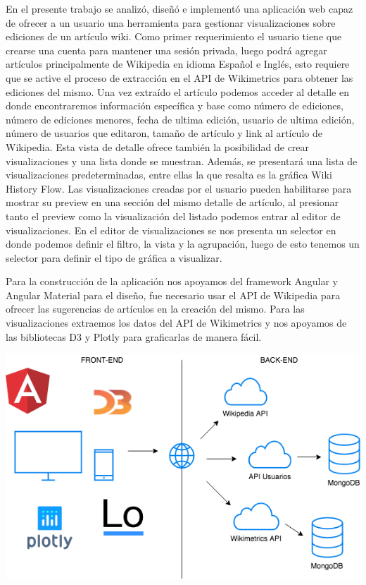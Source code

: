 En el presente trabajo se analizó, diseñó e implementó una aplicación web capaz de ofrecer a un usuario una herramienta para gestionar visualizaciones sobre ediciones de un artículo wiki. Como primer requerimiento el usuario tiene que crearse una cuenta para mantener una sesión privada, luego podrá agregar artículos principalmente de Wikipedia en idioma Español e Inglés, esto requiere que se active el proceso de extracción en el API de Wikimetrics para obtener las ediciones del mismo. Una vez extraído el artículo podemos acceder al detalle en donde encontraremos información específica y base como número de ediciones, número de ediciones menores, fecha de ultima edición, usuario de ultima edición, número de usuarios que editaron, tamaño de artículo y link al artículo de Wikipedia. Esta vista de detalle ofrece también la posibilidad de crear visualizaciones y una lista donde se muestran. Además, se presentará una lista de visualizaciones predeterminadas, entre ellas la que resalta es la gráfica Wiki History Flow. Las visualizaciones creadas por el usuario pueden habilitarse para mostrar su preview en una sección del mismo detalle de artículo, al presionar tanto el preview como la visualización del listado podemos entrar al editor de visualizaciones. En el editor de visualizaciones se nos presenta un selector en donde podemos definir el filtro, la vista y la agrupación, luego de esto tenemos un selector para definir el tipo de gráfica a visualizar. 

Para la construcción de la aplicación nos apoyamos del framework Angular y Angular Material para el diseño, fue necesario usar el API de Wikipedia para ofrecer las sugerencias de artículos en la creación del mismo. Para las visualizaciones extraemos los datos del API de Wikimetrics y nos apoyamos de las bibliotecas D3 y Plotly para graficarlas de manera fácil.

\begin{center}
    \bigbreak
    \includegraphics[scale=0.45]{images/conclusiones/tech_context.png}
    \label{fig:library_comparison}
    \bigbreak
\end{center}


